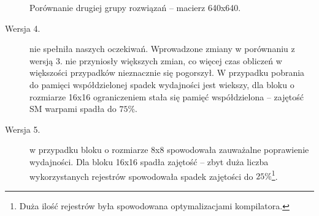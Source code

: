 \begin{figure}[H]
\begin{minipage}[c]{0.46\textwidth}
\vspace{18pt}

\end{minipage}

\caption{Porównanie drugiej grupy rozwiązań -- macierz 640x640.}

\end{figure}

\begin{description}

\item[Wersja 4.] nie spełniła naszych oczekiwań. Wprowadzone zmiany w porównaniu z wersją 3. nie przyniosły większych zmian, co więcej czas obliczeń w większości przypadków nieznacznie się pogorszył. W przypadku pobrania do pamięci współdzielonej spadek wydajności jest wiekszy, dla bloku o rozmiarze 16x16 ograniczeniem stała się pamięć współdzielona -- zajętość SM warpami spadła do $75\%$.

\item[Wersja 5.] w przypadku bloku o rozmiarze 8x8 spowodowała zauważalne poprawienie wydajności. Dla bloku 16x16 spadła zajętość -- zbyt duża liczba wykorzystanych rejestrów spowodowała spadek zajętości do $25\%$\footnote{Duża ilość rejestrów była spowodowana optymalizacjami kompilatora.}.

\end{description}
